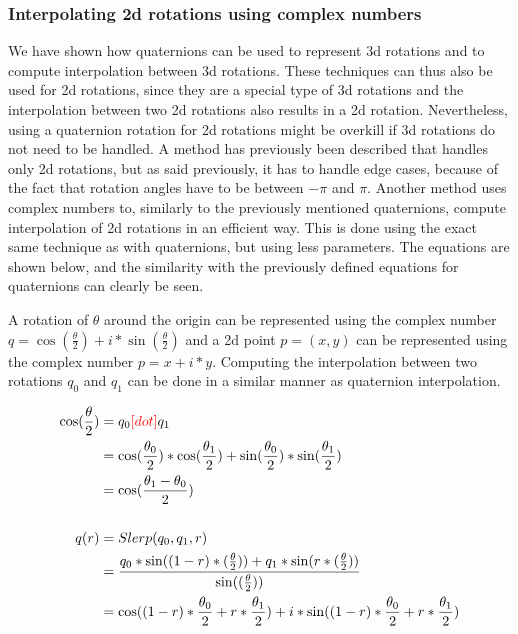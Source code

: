 		\subsubsection{Interpolating 2d rotations using complex numbers}
		
		We have shown how quaternions can be used to represent 3d rotations and to compute interpolation between 3d rotations. These techniques can thus also be used for 2d rotations, since they are a special type of 3d rotations and the interpolation between two 2d rotations also results in a 2d rotation.
		Nevertheless, using a quaternion rotation for 2d rotations might be overkill if 3d rotations do not need to be handled. A method has previously been described that handles only 2d rotations, but as said previously, it has to handle edge cases, because of the fact that rotation angles have to be between \( - \pi \) and \( \pi \). Another method uses complex numbers to, similarly to the previously mentioned quaternions, compute interpolation of 2d rotations in an efficient way. This is done using the exact same technique as with quaternions, but using less parameters. The equations are shown below, and the similarity with the previously defined equations for quaternions can clearly be seen.
		
		A rotation of $\theta$ around the origin can be represented using the complex number \( q = \cos(\frac{\theta}{2}) + i*\sin(\frac{\theta}{2}) \) and a 2d point \( p = (x, y) \) can be represented using the complex number \( p = x + i*y \). Computing the interpolation between two rotations \( q_0 \) and \( q_1 \) can be done in a similar manner as quaternion interpolation.
		
		\begin{equation}
		\begin{split}
		\cos(\frac{\theta}{2})	&= q_0 \textcolor{red}{[dot]} q_1 \\
								&= \cos(\frac{\theta_0}{2})*\cos(\frac{\theta_1}{2}) + \sin(\frac{\theta_0}{2})*\sin(\frac{\theta_1}{2}) \\
								&= \cos(\frac{\theta_1 - \theta_0}{2}) \\
								& \\
		q(r)				&= Slerp(q_0, q_1, r) \\
						&= \frac{q_0 * \sin((1-r)*(\frac{\theta}{2})) + q_1 * \sin(r*(\frac{\theta}{2}))}{\sin((\frac{\theta}{2}))} \\
						&= \cos((1-r)*\frac{\theta_0}{2} + r*\frac{\theta_1}{2}) + i*\sin((1-r)*\frac{\theta_0}{2} + r*\frac{\theta_1}{2}) \\
		\end{split}
		\end{equation}
		

